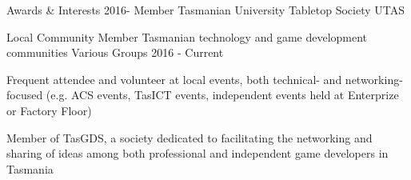 \begin{tmrsection}{Awards \& Interests}
\tmrcolumnentry
    {2016-}
    {Member}
    {Tasmanian University Tabletop Society}
    {UTAS}

\tmrlistentry
    {Local Community Member}
    {Tasmanian technology and game development communities}
    {Various Groups}
    {2016 - Current}
    {\item Frequent attendee and volunteer at local events, both technical- and networking-focused (e.g. ACS events, TasICT events,  independent events held at Enterprize or Factory Floor)
      	\item Member of TasGDS, a society dedicated to facilitating the networking and sharing of ideas among both professional and independent game developers in Tasmania}

\end{tmrsection}
